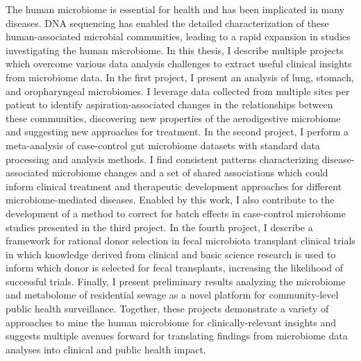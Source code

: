 
The human microbiome is essential for health and has been implicated in many diseases.
DNA sequencing has enabled the detailed characterization of these human-associated microbial communities, leading to a rapid expansion in studies investigating the human microbiome.
In this thesis, I describe multiple projects which overcome various data analysis challenges to extract useful clinical insights from microbiome data.
In the first project, I present an analysis of lung, stomach, and oropharyngeal microbiomes.
I leverage data collected from multiple sites per patient to identify aspiration-associated changes in the relationships between these communities, discovering new properties of the aerodigestive microbiome and suggesting new approaches for treatment.
In the second project, I perform a meta-analysis of case-control gut microbiome datasets with standard data processing and analysis methods.
I find consistent patterns characterizing disease-associated microbiome changes and a set of shared associations which could inform clinical treatment and therapeutic development approaches for different microbiome-mediated diseases.
Enabled by this work, I also contribute to the development of a method to correct for batch effects in case-control microbiome studies presented in the third project.
In the fourth project, I describe a framework for rational donor selection in fecal microbiota transplant clinical trials in which knowledge derived from clinical and basic science research is used to inform which donor is selected for fecal transplants, increasing the likelihood of successful trials.
Finally, I present preliminary results analyzing the microbiome and metabolome of residential sewage as a novel platform for community-level public health surveillance.
Together, these projects demonstrate a variety of approaches to mine the human microbiome for clinically-relevant insights and suggests multiple avenues forward for translating findings from microbiome data analyses into clinical and public health impact.
